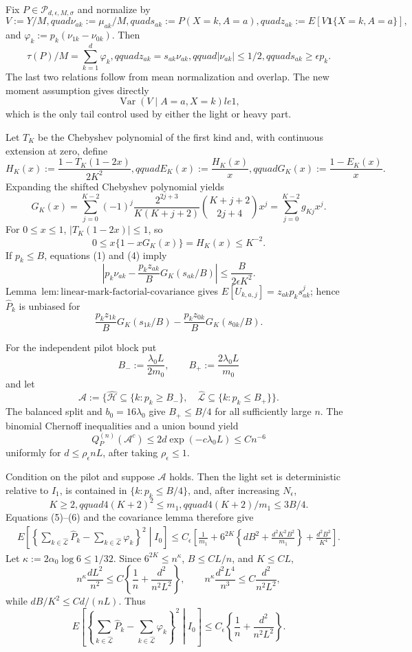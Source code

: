 Fix \(P\in\mathcal P_{d,\epsilon,M,\sigma}\) and normalize by
\[
 V:=Y/M,quad \nu_{ak}:=\mu_{ak}/M,quad
 s_{ak}:=P(X=k,A=a),quad z_{ak}:=E[V\mathbf 1\{X=k,A=a\}],
\]
and \(\varphi_k:=p_k(\nu_{1k}-\nu_{0k})\).  Then
\[
 \tau(P)/M=\sum_{k=1}^d\varphi_k,qquad
 z_{ak}=s_{ak}\nu_{ak},qquad |\nu_{ak}|\le1/2,qquad s_{ak}\ge\epsilon p_k.
\tag{1}
\]
The last two relations follow from mean normalization and overlap.  The new moment assumption gives directly
\[
 \operatorname{Var}(V\mid A=a,X=k)le1,
\tag{2}
\]
which is the only tail control used by either the light or heavy part.

Let \(T_K\) be the Chebyshev polynomial of the first kind and, with continuous extension at zero, define
\[
 H_K(x):=\frac{1-T_K(1-2x)}{2K^2},qquad
 E_K(x):=\frac{H_K(x)}x,qquad
 G_K(x):=\frac{1-E_K(x)}x.
\]
Expanding the shifted Chebyshev polynomial yields
\[
 G_K(x)=\sum_{j=0}^{K-2}(-1)^j
 \frac{2^{2j+3}}{K(K+j+2)}\binom{K+j+2}{2j+4}x^j
 =\sum_{j=0}^{K-2}g_{Kj}x^j.
\tag{3}
\]
For \(0\le x\le1\), \(|T_K(1-2x)|\le1\), so
\[
 0\le x\{1-xG_K(x)\}=H_K(x)\le K^{-2}.
\tag{4}
\]
If \(p_k\le B\), equations (1) and (4) imply
\[
 \left|p_k\nu_{ak}-\frac{p_kz_{ak}}B G_K(s_{ak}/B)\right|
 \le\frac{B}{2\epsilon K^2}.
\tag{5}
\]
Lemma~\(\mathrm{lem:linear\text{-}mark\text{-}factorial\text{-}covariance}\) gives \(E[U_{k,a,j}]=z_{ak}p_ks_{ak}^j\); hence \(\widehat P_k\) is unbiased for
\[
 \frac{p_kz_{1k}}B G_K(s_{1k}/B)-
 \frac{p_kz_{0k}}B G_K(s_{0k}/B).
\tag{6}
\]

For the independent pilot block put
\[
 B_-:=\frac{\lambda_0L}{2m_0},\qquad B_+:=\frac{2\lambda_0L}{m_0}
\]
and let
\[
 \mathcal A:=\{\widehat{\mathcal H}\subseteq\{k:p_k\ge B_-\},\quad
 \widehat{\mathcal L}\subseteq\{k:p_k\le B_+\}\}.
\]
The balanced split and \(b_0=16\lambda_0\) give \(B_+\le B/4\) for all sufficiently large \(n\).  The binomial Chernoff inequalities and a union bound yield
\[
 Q_P^{(n)}(\mathcal A^c)\le2d\exp(-c\lambda_0L)\le Cn^{-6}
\tag{7}
\]
uniformly for \(d\le\rho_\epsilon nL\), after taking \(\rho_\epsilon\le1\).

Condition on the pilot and suppose \(\mathcal A\) holds.  Then the light set is deterministic relative to \(I_1\), is contained in \(\{k:p_k\le B/4\}\), and, after increasing \(N_\epsilon\),
\[
 K\ge2,qquad4(K+2)^2\le m_1,qquad4(K+2)/m_1\le3B/4.
\tag{8}
\]
Equations (5)--(6) and the covariance lemma therefore give
\[
 \begin{split}
 E\left[\left\{\sum_{k\in\widehat{\mathcal L}}\widehat P_k-
 \sum_{k\in\widehat{\mathcal L}}\varphi_k\right\}^2\middle|I_0\right]
 \le C_\epsilon\left[\frac1{m_1}+6^{2K}\left\{dB^2+
 \frac{d^2K^2B^2}{m_1}\right\}+\frac{d^2B^2}{K^4}\right].
\end{split}
\tag{9}
\]
Let \(\kappa:=2\alpha_0\log6\le1/32\).  Since \(6^{2K}\le n^\kappa\), \(B\le CL/n\), and \(K\le CL\),
\[
 n^\kappa\frac{dL^2}{n^2}\le C\left\{\frac1n+\frac{d^2}{n^2L^2}\right\},
 \qquad n^\kappa\frac{d^2L^4}{n^3}\le C\frac{d^2}{n^2L^2},
\tag{10}
\]
while \(dB/K^2\le Cd/(nL)\).  Thus
\[
 E\left[\left\{\sum_{k\in\widehat{\mathcal L}}\widehat P_k-
 \sum_{k\in\widehat{\mathcal L}}\varphi_k\right\}^2\middle|I_0\right]
 \le C_\epsilon\left\{\frac1n+\frac{d^2}{n^2L^2}\right\}.
\tag{11}
\]

